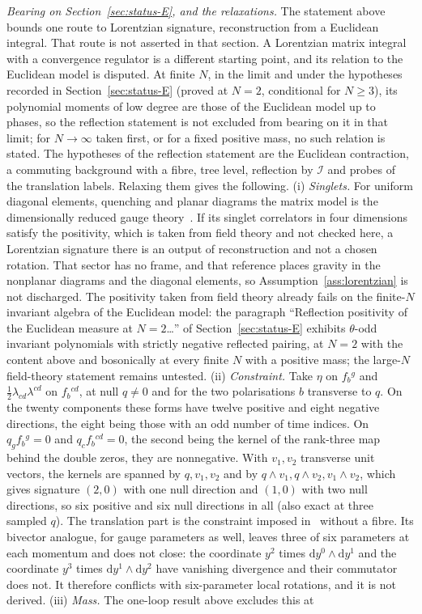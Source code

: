 \emph{Bearing on Section~\ref{sec:status-E}, and the relaxations.} The statement above bounds one route to Lorentzian signature, reconstruction from a Euclidean integral. That route is not asserted in that section. A Lorentzian matrix integral with a convergence regulator is a different starting point, and its relation to the Euclidean model is disputed. At finite \(N\), in the limit and under the hypotheses recorded in Section~\ref{sec:status-E} (proved at \(N=2\), conditional for \(N\ge3\)), its polynomial moments of low degree are those of the Euclidean model up to phases, so the reflection statement is not excluded from bearing on it in that limit; for \(N\to\infty\) taken first, or for a fixed positive mass, no such relation is stated. The hypotheses of the reflection statement are the Euclidean contraction, a commuting background with a fibre, tree level, reflection by \(\mathcal I\) and probes of the translation labels. Relaxing them gives the following. (i) \emph{Singlets.} For uniform diagonal elements, quenching and planar diagrams the matrix model is the dimensionally reduced gauge theory~\cite{HoKawaiSteinacker2025}. If its singlet correlators in four dimensions satisfy the positivity, which is taken from field theory and not checked here, a Lorentzian signature there is an output of reconstruction and not a chosen rotation. That sector has no frame, and that reference places gravity in the nonplanar diagrams and the diagonal elements, so Assumption~\ref{ass:lorentzian} is not discharged. The positivity taken from field theory already fails on the finite-\(N\) invariant algebra of the Euclidean model: the paragraph ``Reflection positivity of the Euclidean measure at \(N=2\)\dots{}'' of Section~\ref{sec:status-E} exhibits \(\theta\)-odd invariant polynomials with strictly negative reflected pairing, at \(N=2\) with the content above and bosonically at every finite \(N\) with a positive mass; the large-\(N\) field-theory statement remains untested. (ii) \emph{Constraint.} Take \(\eta\) on \(f_b{}^g\) and \(\tfrac12\lambda_{cd}\lambda^{cd}\) on \(f_b{}^{cd}\), at null \(q\neq0\) and for the two polarisations \(b\) transverse to \(q\). On the twenty components these forms have twelve positive and eight negative directions, the eight being those with an odd number of time indices. On \(q_gf_b{}^g=0\) and \(q_cf_b{}^{cd}=0\), the second being the kernel of the rank-three map behind the double zeros, they are nonnegative. With \(v_1,v_2\) transverse unit vectors, the kernels are spanned by \(q,v_1,v_2\) and by \(q\wedge v_1,q\wedge v_2,v_1\wedge v_2\), which gives signature \((2,0)\) with one null direction and \((1,0)\) with two null directions, so six positive and six null directions in all (also exact at three sampled \(q\)). The translation part is the constraint imposed in~\cite{HoKawaiSteinacker2025} without a fibre. Its bivector analogue, for gauge parameters as well, leaves three of six parameters at each momentum and does not close: the coordinate \(y^2\) times \(\mathrm dy^0\wedge\mathrm dy^1\) and the coordinate \(y^3\) times \(\mathrm dy^1\wedge\mathrm dy^2\) have vanishing divergence and their commutator does not. It therefore conflicts with six-parameter local rotations, and it is not derived. (iii) \emph{Mass.} The one-loop result above excludes this at 